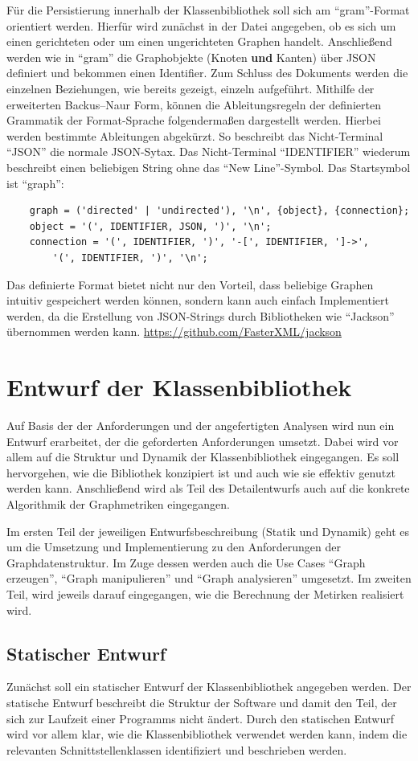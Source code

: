 \documentclass[a4paper,12pt,ngerman,chapterprefix=false,listof=totoc,bibliography=totoc]{scrreprt}
\begin{document}
{{{Für die Persistierung innerhalb der Klassenbibliothek soll sich am "`gram"'-Format orientiert werden. Hierfür wird zunächst in der Datei angegeben, ob es sich um einen gerichteten oder um einen ungerichteten Graphen handelt. Anschließend werden wie in "`gram"' die Graphobjekte (Knoten \textbf{und} Kanten) über JSON definiert und bekommen einen Identifier. Zum Schluss des Dokuments werden die einzelnen Beziehungen, wie bereits gezeigt, einzeln aufgeführt. Mithilfe der erweiterten Backus–Naur Form, können die Ableitungsregeln der definierten Grammatik der Format-Sprache folgendermaßen dargestellt werden. Hierbei werden bestimmte Ableitungen abgekürzt. So beschreibt das Nicht-Terminal "`JSON"' die normale JSON-Sytax. Das Nicht-Terminal "`IDENTIFIER"' wiederum beschreibt einen beliebigen String ohne das "`New Line"'-Symbol. Das Startsymbol ist "`graph"':
\begin{verbatim}
	graph = ('directed' | 'undirected'), '\n', {object}, {connection};
	object = '(', IDENTIFIER, JSON, ')', '\n';
	connection = '(', IDENTIFIER, ')', '-[', IDENTIFIER, ']->', 
		'(', IDENTIFIER, ')', '\n';
\end{verbatim}
Das definierte Format bietet nicht nur den Vorteil, dass beliebige Graphen intuitiv gespeichert werden können, sondern kann auch einfach Implementiert werden, da die Erstellung von JSON-Strings durch Bibliotheken wie "`Jackson"' übernommen werden kann. \url{https://github.com/FasterXML/jackson}
}
\section{Entwurf der Klassenbibliothek}
{
Auf Basis der der Anforderungen und der angefertigten Analysen wird nun ein Entwurf erarbeitet, der die geforderten Anforderungen umsetzt. Dabei wird vor allem auf die Struktur und Dynamik der Klassenbibliothek eingegangen. Es soll hervorgehen, wie die Bibliothek konzipiert ist und auch wie sie effektiv genutzt werden kann. Anschließend wird als Teil des Detailentwurfs auch auf die konkrete Algorithmik der Graphmetriken eingegangen. \cite{balzert_lehrbuch_2011}

Im ersten Teil der jeweiligen Entwurfsbeschreibung (Statik und Dynamik) geht es um die Umsetzung und Implementierung zu den Anforderungen der Graphdatenstruktur. Im Zuge dessen werden auch die Use Cases "`Graph erzeugen"', "`Graph manipulieren"' und "`Graph analysieren"' umgesetzt. Im zweiten Teil, wird jeweils darauf eingegangen, wie die Berechnung der Metirken realisiert wird.
}
\subsection{Statischer Entwurf}
{
Zunächst soll ein statischer Entwurf der Klassenbibliothek angegeben werden. Der statische Entwurf beschreibt die Struktur der Software und damit den Teil, der sich zur Laufzeit einer Programms nicht ändert. Durch den statischen Entwurf wird vor allem klar, wie die Klassenbibliothek verwendet werden kann, indem die relevanten Schnittstellenklassen identifiziert und beschrieben werden.

}}}
\end{document}
